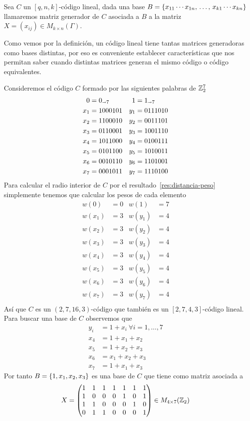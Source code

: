 \begin{definition}
	Sea $C$ un $[q, n, k]$-código lineal, dada una base $B=\left\{x_{11}\cdots x_{1n},\thinspace\dots,\thinspace x_{k1}\cdots x_{kn}\right\}$ llamaremos matriz generador de $C$ asociada a $B$ a la matriz $X=(x_{ij})\in M_{k\times n}(\Gamma)$.
\end{definition}
Como vemos por la definición, un código lineal tiene tantas matrices generadoras como bases distintas, por eso es conveniente establecer características que nos permitan saber cuando distintas matrices generan el mismo código o código equivalentes.
\begin{example}
	\label{ex:matriz-generador}
	Consideremos el código $C$ formado por las siguientes palabras de $\mathbb{Z}_2^7$
	\begin{align*}
		0 &= 0_{\shortrightarrow 7} & 1 &= 1_{\shortrightarrow 7}\\
		x_1 &= 1000101 & y_1 &= 0111010\\
		x_2 &= 1100010 & y_2 &= 0011101\\
		x_3 &= 0110001 & y_3 &= 1001110\\
		x_4 &= 1011000 & y_4 &= 0100111\\
		x_5 &= 0101100 & y_5 &= 1010011\\
		x_6 &= 0010110 & y_6 &= 1101001\\
		x_7 &= 0001011 & y_7 &= 1110100
	\end{align*}
	Para calcular el radio interior de $C$ por el resultado~\eqref{res:distancia-peso} simplemente tenemos que calcular los pesos de cada elemento
	\begin{align*}
		w(0) &= 0 & w(1) &= 7 \\
		w(x_1) &= 3 & w(y_1) &= 4 \\
		w(x_2) &= 3 & w(y_2) &= 4 \\
		w(x_3) &= 3 & w(y_3) &= 4 \\
		w(x_4) &= 3 & w(y_4) &= 4 \\
		w(x_5) &= 3 & w(y_5) &= 4 \\
		w(x_6) &= 3 & w(y_6) &= 4 \\
		w(x_7) &= 3 & w(y_7) &= 4 \\
	\end{align*}
	Así que $C$ es un $(2, 7, 16, 3)$-código que también es un $[2, 7, 4, 3]$-código lineal.
	Para buscar una base de $C$ observemos que
	\begin{align*}
		y_i &= 1+x_i\ \forall i=1,\dots, 7\\
		x_4 &= 1+x_1+x_2\\
		x_5 &= 1+x_2+x_3\\
		x_6 &= x_1+x_2+x_3\\
		x_7 &= 1+x_1+x_3
	\end{align*}
	Por tanto $B=\left\{1, x_1, x_2, x_3\right\}$ es una base de $C$ que tiene como matriz asociada a
	\[
		X=\begin{pmatrix*}
			  1&1&1&1&1&1&1\\
			  1&0&0&0&1&0&1\\
			  1&1&0&0&0&1&0\\
			  0&1&1&0&0&0&1
		\end{pmatrix*}\in M_{4\times 7}(\Z_2)
	\]
\end{example}

